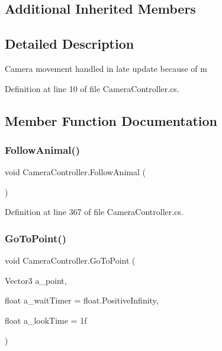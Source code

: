 \subsection*{Additional Inherited Members}


\subsection{Detailed Description}
Camera movement handled in late update because of m 



Definition at line 10 of file Camera\+Controller.\+cs.



\subsection{Member Function Documentation}
\mbox{\label{class_camera_controller_a9b8ad016594f7b86daa8406f9f8fe31f}} 
\subsubsection{\texorpdfstring{Follow\+Animal()}{FollowAnimal()}}
{\footnotesize\ttfamily void Camera\+Controller.\+Follow\+Animal (\begin{DoxyParamCaption}{ }\end{DoxyParamCaption})}



Definition at line 367 of file Camera\+Controller.\+cs.

\mbox{\label{class_camera_controller_a2720f41abfc672dea4fd3e386eb4e3fa}} 
\subsubsection{\texorpdfstring{Go\+To\+Point()}{GoToPoint()}}
{\footnotesize\ttfamily void Camera\+Controller.\+Go\+To\+Point (\begin{DoxyParamCaption}\item[{Vector3}]{a\+\_\+point,  }\item[{float}]{a\+\_\+wait\+Timer = {\ttfamily float.PositiveInfinity},  }\item[{float}]{a\+\_\+look\+Time = {\ttfamily 1f} }\end{DoxyParamCaption})}



